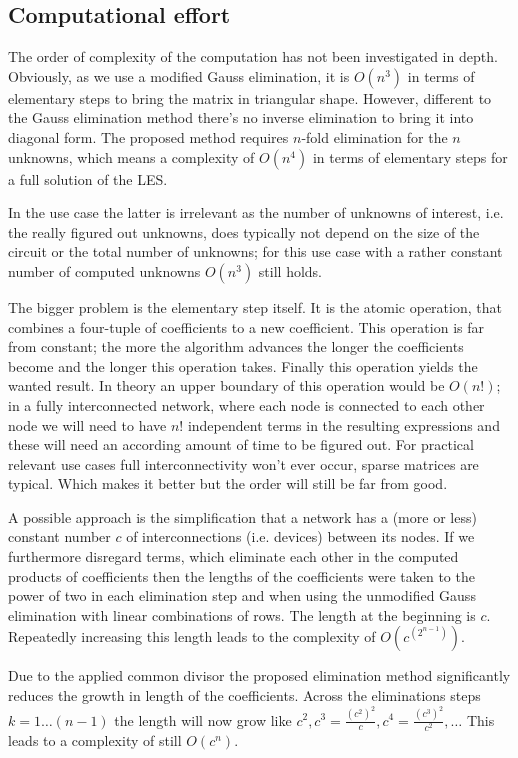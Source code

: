\subsection{Computational effort}

The order of complexity of the computation has not been investigated in
depth. Obviously, as we use a modified Gauss elimination, it is $O(n^3)$
in terms of elementary steps to bring the matrix in triangular shape.
However, different to the Gauss elimination method there's no inverse
elimination to bring it into diagonal form. The proposed method requires
$n$-fold elimination for the $n$ unknowns, which means a complexity of
$O(n^4)$ in terms of elementary steps for a full solution of the LES.

In the \linnet{} use case the latter is irrelevant as the number of
unknowns of interest, i.e. the really figured out unknowns, does typically
not depend on the size of the circuit or the total number of unknowns; for
this use case with a rather constant number of computed unknowns $O(n^3)$
still holds.

The bigger problem is the elementary step itself. It is the atomic operation, that
combines a four-tuple of coefficients to a new coefficient. This operation
is far from constant; the more the algorithm advances the longer the
coefficients become and the longer this operation takes. Finally this
operation yields the wanted result. In theory an upper boundary of this
operation would be $O(n!)$; in a fully interconnected network, where each
node is connected to each other node we will need to have $n!$ independent
terms in the resulting expressions and these will need an according amount
of time to be figured out. For practical relevant use cases full
interconnectivity won't ever occur, sparse matrices are typical. Which makes
it better but the order will still be far from good.

A possible approach is the simplification that a network has a (more or
less) constant number $c$ of interconnections (i.e. devices) between its
nodes. If we furthermore disregard terms, which eliminate each other in
the computed products of coefficients then the lengths of the coefficients
were taken to the power of two in each elimination step and when using the
unmodified Gauss elimination with linear combinations of rows. The
length at the beginning is $c$. Repeatedly increasing this length leads to
the complexity of $O(c^{(2^{n-1})})$.

Due to the applied common divisor the proposed elimination method
significantly reduces the growth in length of the coefficients. Across the
eliminations steps $k=1 \ldots (n-1)$ the length will now grow like $c^2, c^3
= \frac{(c^2)^2}{c}, c^4 = \frac{(c^3)^2}{c^2}, \ldots$ This leads to a
complexity of still $O(c^n)$.

